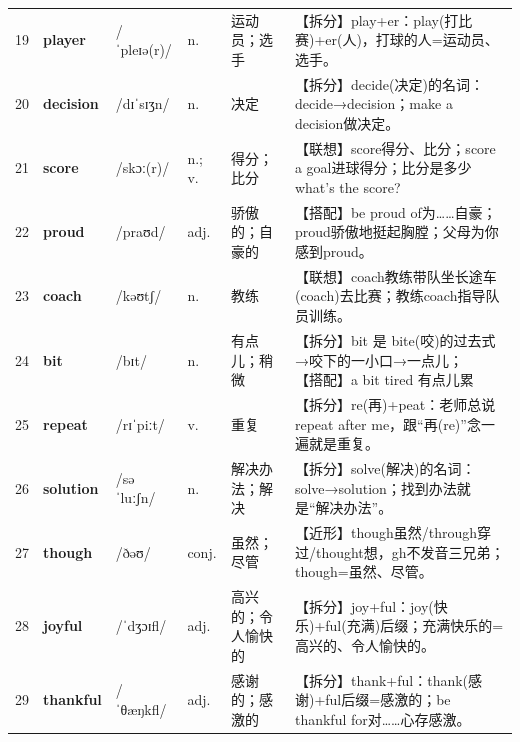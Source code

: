 \documentclass[UTF8,a4paper,11pt,oneside]{ctexbook}
\newcommand{\cellword}[1]{{\bfseries\textcolor{wordcol}{#1}}}
\newcommand{\cellipa}[1]{{\footnotesize\textcolor{ipacol}{#1}}}
\newcommand{\cellpos}[1]{\textcolor{poscol}{#1}}
\newcommand{\cellno}[1]{\textcolor{volcolor!75!black}{#1}}
\begin{document}
{\begin{longtable}{@{}C{0.045\textwidth}L{0.155\textwidth}L{0.175\textwidth}C{0.070\textwidth}L{0.180\textwidth}L{0.282\textwidth}@{}}
 \cellno{19} & \cellword{player} & \cellipa{/ˈpleɪə(r)/} & \cellpos{n.} & 运动员；选手 & \textcolor{tagSplit}{【拆分】}play+er：play(打比赛)+er(人)，打球的人=运动员、选手。 \\
\cellno{20} & \cellword{decision} & \cellipa{/dɪˈsɪʒn/} & \cellpos{n.} & 决定 & \textcolor{tagSplit}{【拆分】}decide(决定)的名词：decide→\allowbreak{}decision；make a decision做决定。 \\
 \cellno{21} & \cellword{score} & \cellipa{/skɔː(r)/} & \cellpos{n.;\allowbreak{} v.} & 得分；比分 & \textcolor{tagAssoc}{【联想】}score得分、比分；score a goal进球得分；比分是多少what's the score? \\
\cellno{22} & \cellword{proud} & \cellipa{/praʊd/} & \cellpos{adj.} & 骄傲的；自豪的 & \textcolor{tagColloc}{【搭配】}be proud of为……自豪；proud骄傲地挺起胸膛；父母为你感到proud。 \\
 \cellno{23} & \cellword{coach} & \cellipa{/kəʊtʃ/} & \cellpos{n.} & 教练 & \textcolor{tagAssoc}{【联想】}coach教练带队坐长途车(coach)去比赛；教练coach指导队员训练。 \\
\cellno{24} & \cellword{bit} & \cellipa{/bɪt/} & \cellpos{n.} & 有点儿；稍微 & \textcolor{tagSplit}{【拆分】}bit 是 bite(咬)的过去式→\allowbreak{}咬下的一小口→\allowbreak{}一点儿；\textcolor{tagColloc}{【搭配】}a bit tired 有点儿累 \\
 \cellno{25} & \cellword{repeat} & \cellipa{/rɪˈpiːt/} & \cellpos{v.} & 重复 & \textcolor{tagSplit}{【拆分】}re(再)+peat：老师总说repeat after me，跟“再(re)”念一遍就是重复。 \\
\cellno{26} & \cellword{solution} & \cellipa{/səˈluːʃn/} & \cellpos{n.} & 解决办法；解决 & \textcolor{tagSplit}{【拆分】}solve(解决)的名词：solve→\allowbreak{}solution；找到办法就是“解决办法”。 \\
 \cellno{27} & \cellword{though} & \cellipa{/ðəʊ/} & \cellpos{conj.} & 虽然；尽管 & \textcolor{tagNear}{【近形】}though虽然/through穿过/thought想，gh不发音三兄弟；though=虽然、尽管。 \\
\cellno{28} & \cellword{joyful} & \cellipa{/ˈdʒɔɪfl/} & \cellpos{adj.} & 高兴的；令人愉快的 & \textcolor{tagSplit}{【拆分】}joy+ful：joy(快乐)+ful(充满)后缀；充满快乐的=高兴的、令人愉快的。 \\
 \cellno{29} & \cellword{thankful} & \cellipa{/ˈθæŋkfl/} & \cellpos{adj.} & 感谢的；感激的 & \textcolor{tagSplit}{【拆分】}thank+ful：thank(感谢)+ful后缀=感激的；be thankful for对……心存感激。 \\

\end{longtable}}
\end{document}

